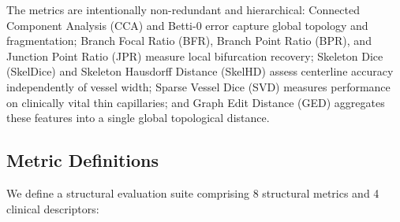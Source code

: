\documentclass[conference]{IEEEtran}
\begin{document}
The metrics are intentionally non-redundant and hierarchical: Connected Component Analysis (CCA) and Betti-0 error capture global topology and fragmentation; Branch Focal Ratio (BFR), Branch Point Ratio (BPR), and Junction Point Ratio (JPR) measure local bifurcation recovery; Skeleton Dice (SkelDice) and Skeleton Hausdorff Distance (SkelHD) assess centerline accuracy independently of vessel width; Sparse Vessel Dice (SVD) measures performance on clinically vital thin capillaries; and Graph Edit Distance (GED) aggregates these features into a single global topological distance.

\subsection{Metric Definitions}
We define a structural evaluation suite comprising 8 structural metrics and 4 clinical descriptors:
\end{document}
